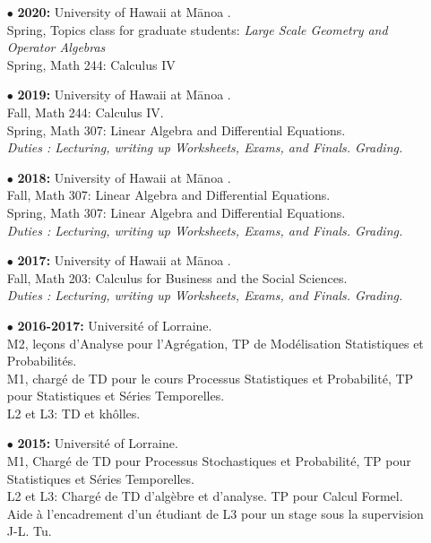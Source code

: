 \documentclass[a4paper,11pt]{article}
\begin{document}
\begin{itemize}

\item[$\bullet$] \textbf{2020:} University of Hawaii at M\={a}noa .\\
				Spring, Topics class for graduate students: \textit{Large Scale Geometry and Operator Algebras}\\
				Spring, Math 244: Calculus IV\\
\item[$\bullet$] \textbf{2019:} University of Hawaii at M\={a}noa .\\
					Fall, Math 244: Calculus IV.\\
					Spring, Math 307: Linear Algebra and Differential Equations.\\
					\textit{Duties : Lecturing, writing up Worksheets, Exams, and Finals. Grading.}\\

\item[$\bullet$] \textbf{2018:} University of Hawaii at M\={a}noa .\\
					Fall, Math 307: Linear Algebra and Differential Equations.\\
					Spring, Math 307: Linear Algebra and Differential Equations.\\
					\textit{Duties : Lecturing, writing up Worksheets, Exams, and Finals. Grading.}\\

\item[$\bullet$] \textbf{2017:} University of Hawaii at M\={a}noa .\\
					Fall, Math 203: Calculus for Business and the Social Sciences.\\
					\textit{Duties : Lecturing, writing up Worksheets, Exams, and Finals. Grading.}\\

\item[$\bullet$] \textbf{2016-2017:} Universit\'e of Lorraine.\\
					M2, le\c{c}ons d'Analyse pour l'Agrégation, TP de Mod\'elisation Statistiques et Probabilit\'es.\\
					M1,	charg\'e de TD pour le cours Processus Statistiques et Probabilit\'e, TP pour Statistiques et S\'eries Temporelles. \\
					L2 et L3: TD et kh\^{o}lles. \\  
\item[$\bullet$] \textbf{2015:} Universit\'e of Lorraine.\\
					M1, Charg\'e de TD pour Processus Stochastiques et Probabilit\'e, TP pour Statistiques et S\'eries Temporelles.\\
					L2 et L3: Charg\'e de TD d'alg\`ebre et d'analyse. TP pour Calcul Formel.\\ 
					Aide \`a l'encadrement d'un \'etudiant de L3 pour un stage sous la supervision J-L. Tu.\\
					

\end{itemize}
\end{document}
